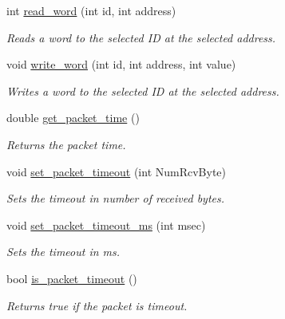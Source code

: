 \begin{DoxyCompactItemize}
int \hyperlink{a00004_a45e99341e82c5114f6e829c9141bf96f}{read\+\_\+word} (int id, int address)
\begin{DoxyCompactList}\small\item\em Reads a word to the selected I\+D at the selected address. \end{DoxyCompactList}\item 
void \hyperlink{a00004_a925f62ce5e261e5ef4fe6dc46bdc7c63}{write\+\_\+word} (int id, int address, int value)
\begin{DoxyCompactList}\small\item\em Writes a word to the selected I\+D at the selected address. \end{DoxyCompactList}\item 
double \hyperlink{a00004_a2fa5375537184c279a9ebfcfc0425071}{get\+\_\+packet\+\_\+time} ()
\begin{DoxyCompactList}\small\item\em Returns the packet time. \end{DoxyCompactList}\item 
void \hyperlink{a00004_a067f82c21ed176e18fa224d16f3d1c5b}{set\+\_\+packet\+\_\+timeout} (int Num\+Rcv\+Byte)
\begin{DoxyCompactList}\small\item\em Sets the timeout in number of received bytes. \end{DoxyCompactList}\item 
void \hyperlink{a00004_a125b42f776c4aac520f274074f68b591}{set\+\_\+packet\+\_\+timeout\+\_\+ms} (int msec)
\begin{DoxyCompactList}\small\item\em Sets the timeout in ms. \end{DoxyCompactList}\item 
bool \hyperlink{a00004_a00d08481ebc4dee19debecf43f888522}{is\+\_\+packet\+\_\+timeout} ()
\begin{DoxyCompactList}\small\item\em Returns true if the packet is timeout. \end{DoxyCompactList}\end{DoxyCompactItemize}
